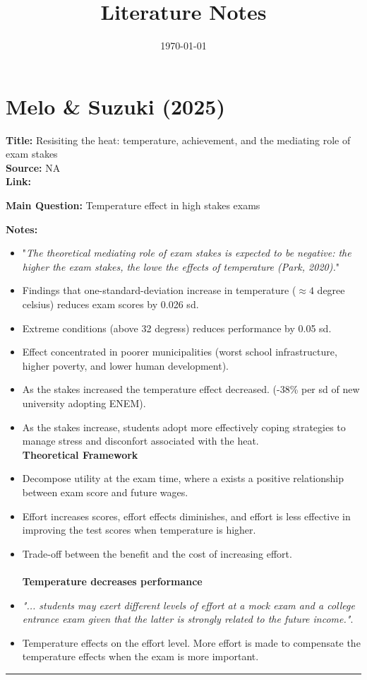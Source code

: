 \documentclass[11pt]{article}
\newcommand{\paperentry}[6]{
	\section*{#1 (#2)}
	
	\textbf{Title:} #3 \\
	\textbf{Source:} #4 \\
	\textbf{Link:} \href{#5}{#5}
	
	\vspace{0.5em}
	
	\textbf{Main Question:}
	#6
	
	\vspace{0.5em}
	\textbf{Notes:}
	\begin{itemize}
	}
\newcommand{\finishpaper}{
	\end{itemize}
	\vspace{1em}
	\hrule
	\vspace{1em}
}
\begin{document}
	
	\title{Literature Notes}
	\date{\today}
	\maketitle
	
	\paperentry
	{Melo \& Suzuki}
	{2025}
	{Resisiting the heat: temperature, achievement, and the mediating role of exam stakes}
	{NA}
	{}
	{Temperature effect in high stakes exams}
	
	\item "\textit{The theoretical mediating role of exam stakes is expected to be negative: the higher the exam stakes, the lowe the effects of temperature (Park, 2020).}"
	\item  Findings that one-standard-deviation increase in temperature ($\approx 4$ degree celsius) reduces exam scores by 0.026 sd.
	\item Extreme conditions (above 32 degress) reduces performance by 0.05 sd.
	\item Effect concentrated in poorer municipalities (worst school infrastructure, higher poverty, and lower human development).
	\item As the stakes increased the temperature effect decreased. (-38\% per sd of new university adopting ENEM).
	\item As the stakes increase, students adopt more effectively coping strategies to manage stress and disconfort associated with the heat.
	\\
	
	\textbf{Theoretical Framework}
	\item Decompose utility at the exam time, where a exists a positive relationship between exam score and future wages.
	\item Effort increases scores, effort effects diminishes, and effort is less effective in improving the test scores when temperature is higher.
	\item Trade-off between the benefit and the cost of increasing effort.\\
	\\
	\textbf{Temperature decreases performance}
	\item \textit{"... students may exert different levels of effort at a mock exam and a college entrance exam given that the latter is strongly related to the future income."}.
	\item Temperature effects on the effort level. More effort is made to compensate the temperature effects when the exam is more important.
	
	
	\finishpaper
	
\end{document}
